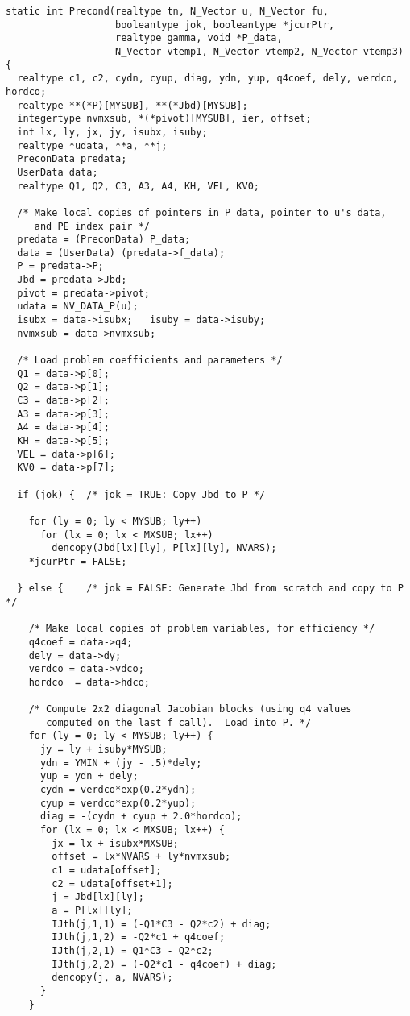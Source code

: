 \begin{verbatim}
static int Precond(realtype tn, N_Vector u, N_Vector fu,
                   booleantype jok, booleantype *jcurPtr, 
                   realtype gamma, void *P_data, 
                   N_Vector vtemp1, N_Vector vtemp2, N_Vector vtemp3)
{
  realtype c1, c2, cydn, cyup, diag, ydn, yup, q4coef, dely, verdco, hordco;
  realtype **(*P)[MYSUB], **(*Jbd)[MYSUB];
  integertype nvmxsub, *(*pivot)[MYSUB], ier, offset;
  int lx, ly, jx, jy, isubx, isuby;
  realtype *udata, **a, **j;
  PreconData predata;
  UserData data;
  realtype Q1, Q2, C3, A3, A4, KH, VEL, KV0;

  /* Make local copies of pointers in P_data, pointer to u's data,
     and PE index pair */
  predata = (PreconData) P_data;
  data = (UserData) (predata->f_data);
  P = predata->P;
  Jbd = predata->Jbd;
  pivot = predata->pivot;
  udata = NV_DATA_P(u);
  isubx = data->isubx;   isuby = data->isuby;
  nvmxsub = data->nvmxsub;

  /* Load problem coefficients and parameters */
  Q1 = data->p[0];
  Q2 = data->p[1];
  C3 = data->p[2];
  A3 = data->p[3];
  A4 = data->p[4];
  KH = data->p[5];
  VEL = data->p[6];
  KV0 = data->p[7];

  if (jok) {  /* jok = TRUE: Copy Jbd to P */

    for (ly = 0; ly < MYSUB; ly++)
      for (lx = 0; lx < MXSUB; lx++)
        dencopy(Jbd[lx][ly], P[lx][ly], NVARS);
    *jcurPtr = FALSE;

  } else {    /* jok = FALSE: Generate Jbd from scratch and copy to P */

    /* Make local copies of problem variables, for efficiency */
    q4coef = data->q4;
    dely = data->dy;
    verdco = data->vdco;
    hordco  = data->hdco;
    
    /* Compute 2x2 diagonal Jacobian blocks (using q4 values 
       computed on the last f call).  Load into P. */
    for (ly = 0; ly < MYSUB; ly++) {
      jy = ly + isuby*MYSUB;
      ydn = YMIN + (jy - .5)*dely;
      yup = ydn + dely;
      cydn = verdco*exp(0.2*ydn);
      cyup = verdco*exp(0.2*yup);
      diag = -(cydn + cyup + 2.0*hordco);
      for (lx = 0; lx < MXSUB; lx++) {
        jx = lx + isubx*MXSUB;
        offset = lx*NVARS + ly*nvmxsub;
        c1 = udata[offset];
        c2 = udata[offset+1];
        j = Jbd[lx][ly];
        a = P[lx][ly];
        IJth(j,1,1) = (-Q1*C3 - Q2*c2) + diag;
        IJth(j,1,2) = -Q2*c1 + q4coef;
        IJth(j,2,1) = Q1*C3 - Q2*c2;
        IJth(j,2,2) = (-Q2*c1 - q4coef) + diag;
        dencopy(j, a, NVARS);
      }
    }
    

\end{verbatim}
